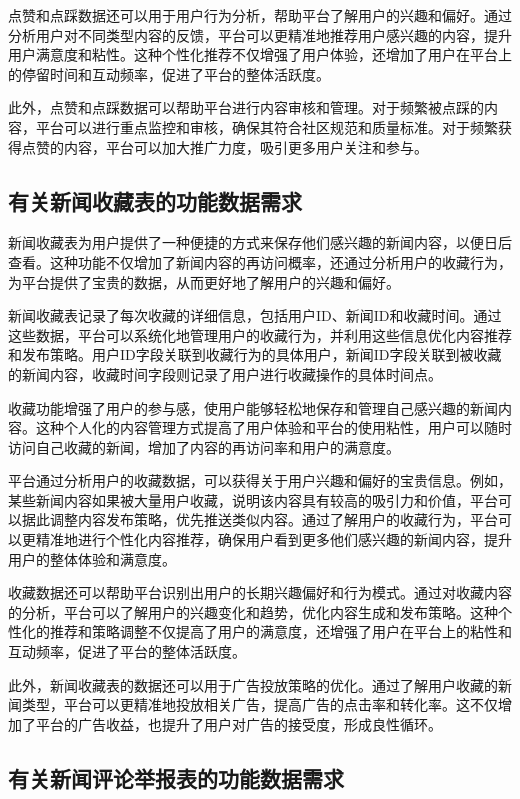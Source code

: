 点赞和点踩数据还可以用于用户行为分析，帮助平台了解用户的兴趣和偏好。通过分析用户对不同类型内容的反馈，平台可以更精准地推荐用户感兴趣的内容，提升用户满意度和粘性。这种个性化推荐不仅增强了用户体验，还增加了用户在平台上的停留时间和互动频率，促进了平台的整体活跃度。

此外，点赞和点踩数据可以帮助平台进行内容审核和管理。对于频繁被点踩的内容，平台可以进行重点监控和审核，确保其符合社区规范和质量标准。对于频繁获得点赞的内容，平台可以加大推广力度，吸引更多用户关注和参与。

\subsection{有关新闻收藏表的功能数据需求}

新闻收藏表为用户提供了一种便捷的方式来保存他们感兴趣的新闻内容，以便日后查看。这种功能不仅增加了新闻内容的再访问概率，还通过分析用户的收藏行为，为平台提供了宝贵的数据，从而更好地了解用户的兴趣和偏好。

新闻收藏表记录了每次收藏的详细信息，包括用户ID、新闻ID和收藏时间。通过这些数据，平台可以系统化地管理用户的收藏行为，并利用这些信息优化内容推荐和发布策略。用户ID字段关联到收藏行为的具体用户，新闻ID字段关联到被收藏的新闻内容，收藏时间字段则记录了用户进行收藏操作的具体时间点。

收藏功能增强了用户的参与感，使用户能够轻松地保存和管理自己感兴趣的新闻内容。这种个人化的内容管理方式提高了用户体验和平台的使用粘性，用户可以随时访问自己收藏的新闻，增加了内容的再访问率和用户的满意度。

平台通过分析用户的收藏数据，可以获得关于用户兴趣和偏好的宝贵信息。例如，某些新闻内容如果被大量用户收藏，说明该内容具有较高的吸引力和价值，平台可以据此调整内容发布策略，优先推送类似内容。通过了解用户的收藏行为，平台可以更精准地进行个性化内容推荐，确保用户看到更多他们感兴趣的新闻内容，提升用户的整体体验和满意度。

收藏数据还可以帮助平台识别出用户的长期兴趣偏好和行为模式。通过对收藏内容的分析，平台可以了解用户的兴趣变化和趋势，优化内容生成和发布策略。这种个性化的推荐和策略调整不仅提高了用户的满意度，还增强了用户在平台上的粘性和互动频率，促进了平台的整体活跃度。

此外，新闻收藏表的数据还可以用于广告投放策略的优化。通过了解用户收藏的新闻类型，平台可以更精准地投放相关广告，提高广告的点击率和转化率。这不仅增加了平台的广告收益，也提升了用户对广告的接受度，形成良性循环。

\subsection{有关新闻评论举报表的功能数据需求}

